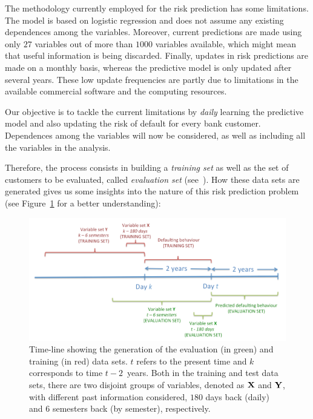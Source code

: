 The methodology currently employed for the risk prediction has some limitations. The model is based on logistic regression and does not assume any existing dependences among the variables. Moreover, current predictions are made using only $27$ variables out of more than $1000$ variables available, which might mean that useful information is being discarded. Finally, updates in risk predictions are made on a monthly basis, whereas the predictive model is only updated after several years. These low update frequencies are partly due to limitations in the available commercial software and the computing resources.

Our objective is to tackle the current limitations by \textit{daily} learning the predictive model and also updating the risk of default for every bank customer. Dependences among the variables will now be considered, as well as including all the variables in the analysis. 

Therefore, the process consists in building a \textit{training set} as well as the set of customers to be evaluated, called \textit{evaluation set} (see~\cite{Fer14b}). How these data sets are generated gives us some insights into the nature of this risk prediction problem (see Figure~\ref{Figure:CajaMarTimeLine} for a better understanding):


\begin{figure}[ht!]
\centering
\includegraphics[scale=0.45]{figures/CajaMarTimeLine}
\caption{\label{Figure:CajaMarTimeLine}Time-line showing the generation of the evaluation (in green) and training (in red) data sets. $t$ refers to the present time and $k$ corresponds to time $t-2$\ years. Both in the training and test data sets, there are two disjoint groups of variables, denoted as $\mathbf{X}$ and $\mathbf{Y}$, with different past information considered, $180$ days back (daily) and $6$ semesters back (by semester), respectively.}

\end{figure}

